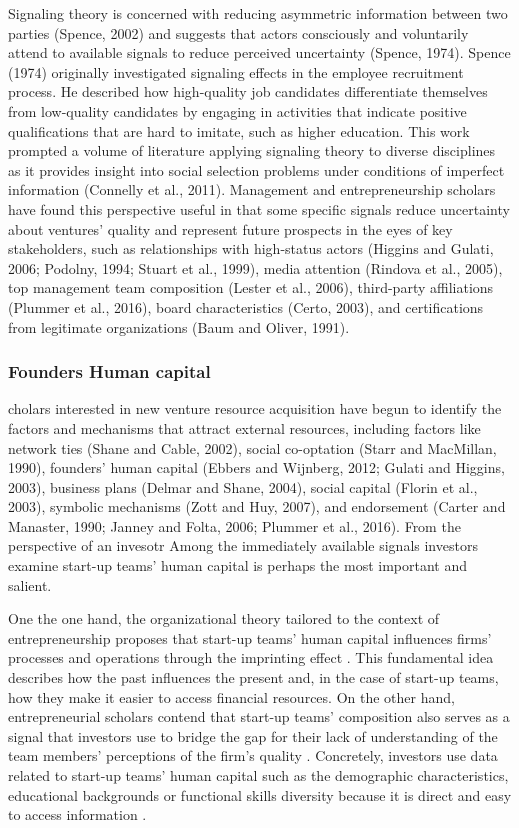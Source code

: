 \documentclass[12pt]{article}
\begin{document}
Signaling theory is concerned with reducing asymmetric information between two parties (Spence, 2002) and suggests that actors consciously and voluntarily attend to available signals to reduce perceived uncertainty (Spence, 1974). Spence (1974) originally investigated signaling effects in the employee recruitment process. He described how high-quality job candidates differentiate themselves from low-quality candidates by engaging in activities that indicate positive qualifications that are hard to imitate, such as higher education. This work prompted a volume of literature applying signaling theory to diverse disciplines as it provides insight into social selection problems under conditions of imperfect information (Connelly et al., 2011). Management and entrepreneurship scholars have found this perspective useful in that some specific signals reduce uncertainty about ventures' quality and represent future prospects in the eyes of key stakeholders, such as relationships with high-status actors (Higgins and Gulati, 2006; Podolny, 1994; Stuart et al., 1999), media attention (Rindova et al., 2005), top management team composition (Lester et al., 2006), third-party affiliations (Plummer et al., 2016), board characteristics (Certo, 2003), and certifications from legitimate organizations (Baum and Oliver, 1991).

\subsubsection{Founders Human capital}

cholars interested in new venture resource acquisition have begun to identify the factors and mechanisms that attract external resources, including factors like network ties (Shane and Cable, 2002), social co-optation (Starr and MacMillan, 1990), founders' human capital (Ebbers and Wijnberg, 2012; Gulati and Higgins, 2003), business plans (Delmar and Shane, 2004), social capital (Florin et al., 2003), symbolic mechanisms (Zott and Huy, 2007), and endorsement (Carter and Manaster, 1990; Janney and Folta, 2006; Plummer et al., 2016). From the perspective of an invesotr Among the immediately available signals investors examine start-up teams' human capital is perhaps the most important and salient.

One the one hand, the organizational theory tailored to the context of entrepreneurship proposes that start-up teams' human capital influences firms' processes and operations through the imprinting effect \citep{packalen2007complementing}. This fundamental idea describes how the past influences the present and, in the case of start-up teams, how they make it easier to access financial resources. On the other hand, entrepreneurial scholars contend that start-up teams' composition also serves as a signal \citep{spence1974market} that investors use to bridge the gap for their lack of understanding of the team members' perceptions of the firm's quality \citep{plummer2016better}. Concretely, investors use data related to start-up teams' human capital such as the demographic characteristics, educational backgrounds or functional skills diversity because it is direct and easy to access information \citep{colombo2005founders, beckman2007early, eddleston2016you}.
\end{document}
